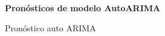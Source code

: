 %
\begin{figure}[H]
	\centering
	\textbf{Pronósticos de modelo AutoARIMA}\par\medskip
	\caption{Pronóstico auto ARIMA}\label{fig26}
\end{figure}

